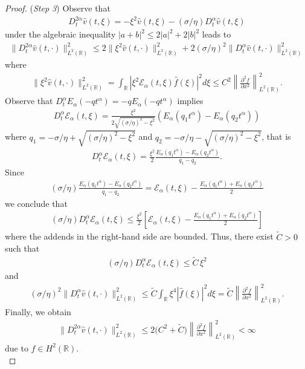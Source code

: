 \documentclass[10pt,a4paper]{article}
\numberwithin{equation}{section}
\theoremstyle{plain}
\theoremstyle{remark}
\begin{document}
\begin{proof}
({\it Step 3})
Observe that
\begin{align*}
D^{2\alpha}_t \hat{v}(t, \xi) = -\xi^2 \hat{v}(t, \xi) - (\sigma/\eta) D^\alpha_t \hat{v}(t, \xi)
\end{align*}
under the algebraic inequality $|a + b|^2 \le 2|a|^2 + 2|b|^2$ leads to
\begin{align*}
\|D^{2\alpha}_t \hat{v}(t, \cdot)\|^2_{L^2(\mathbb{R})} \le 2 \|\xi^2 \hat{v}(t, \cdot)\|^2_{L^2(\mathbb{R})} + 2(\sigma/\eta)^2 \|D^\alpha_t \hat{v}(t, \cdot)\|^2_{L^2(\mathbb{R})}
\end{align*}
where
\begin{align*}
\|\xi^2 \hat{v}(t, \cdot)\|^2_{L^2(\mathbb{R})} = \int_\mathbb{R} |\xi^2 \mathcal{E}_\alpha(t,\xi) \hat{f}(\xi) |^2 d\xi \leq C^2 \left\|\frac{\partial^2 f}{\partial x^2}\right\|^2_{L^2(\mathbb{R})}.
\end{align*}
Observe that $D^\alpha_t E_\alpha(- q t^\alpha)= - q E_\alpha(-q t^\alpha)$ implies 
\begin{align*}
D^\alpha_t \mathcal{E}_{\alpha}(t,\xi) = \frac{\xi^2}{2 \sqrt{(\sigma/\eta)^2 - \xi^2}} \left( E_\alpha(q_1 t^\alpha) - E_\alpha(q_2 t^\alpha) \right)
\end{align*}
where $q_1 = -\sigma/\eta + \sqrt{(\sigma/\eta)^2-\xi^2}$ and $q_2 = -\sigma/\eta - \sqrt{(\sigma/\eta)^2-\xi^2}$, that is
\begin{align*}
D^\alpha_t \mathcal{E}_{\alpha}(t,\xi) = \frac{\xi^2}{2} \frac{E_\alpha(q_1 t^\alpha) - E_\alpha(q_2 t^\alpha)}{q_1 -q_2}.
\end{align*}
Since
\begin{align*}
(\sigma/\eta) \frac{E_\alpha(q_1t^\alpha) - E_\alpha(q_2t^\alpha)}{q_1 - q_2} = \mathcal{E}_\alpha(t, \xi) - \frac{E_\alpha(q_1 t^\alpha) + E_\alpha(q_2 t^\alpha)}{2}
\end{align*}
we conclude that
\begin{align*}
(\sigma/\eta) D^\alpha_t \mathcal{E}_{\alpha}(t,\xi) \leq \frac{\xi^2}{2} \left[ \mathcal{E}_\alpha(t, \xi) - \frac{E_\alpha(q_1 t^\alpha) + E_\alpha(q_2 t^\alpha)}{2} \right]
\end{align*}
where the addends in the right-hand side are bounded. Thus, there exist $\tilde{C}>0$ such that 
\begin{align*}
(\sigma/\eta)  D^\alpha_t \mathcal{E}_{\alpha}(t,\xi) \leq \tilde{C}\, \xi^2
\end{align*}
and
\begin{align*}
(\sigma/\eta)^2 \|D^\alpha_t \hat{v}(t, \cdot)\|^2_{L^2(\mathbb{R})} \leq \tilde{C} \int_\mathbb{R} \xi^4 |\hat{f}(\xi)|^2 d\xi = \tilde{C} \left\|\frac{\partial^2 f}{\partial x^2}\right\|^2_{L^2(\mathbb{R})}.
\end{align*}
Finally, we obtain 
\begin{align*}
\|D^{2\alpha}_t \hat{v}(t, \cdot)\|^2_{L^2(\mathbb{R})} \le 2 \big(C^2 + \tilde{C} \big) \left\|\frac{\partial^2 f}{\partial x^2}\right\|^2_{L^2(\mathbb{R})} < \infty
\end{align*}
due to $f \in H^2(\mathbb{R})$.\\


\end{proof}
\end{document}
